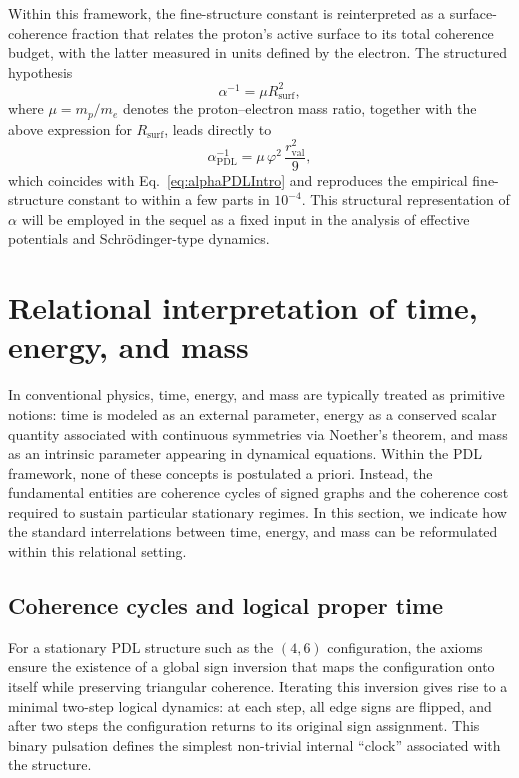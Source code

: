 \documentclass[11pt,a4paper]{article}
\begin{document}
Within this framework, the fine-structure constant is reinterpreted as a surface-coherence fraction that relates the proton’s active surface to its total coherence budget, with the latter measured in units defined by the electron. The structured hypothesis
\begin{equation}
\alpha^{-1} = \mu R_{\mathrm{surf}}^{2},
\end{equation}
where $\mu = m_p/m_e$ denotes the proton--electron mass ratio, together with the above expression for $R_{\mathrm{surf}}$, leads directly to
\begin{equation}
\alpha_{\mathrm{PDL}}^{-1} = \mu\,\varphi^{2}\,\frac{r_{\mathrm{val}}^{2}}{9},
\label{eq:alphaPDL}
\end{equation}
which coincides with Eq.~\eqref{eq:alphaPDLIntro} and reproduces the empirical fine-structure constant to within a few parts in $10^{-4}$.\cite{Laubscher2026DerivationAlpha} This structural representation of $\alpha$ will be employed in the sequel as a fixed input in the analysis of effective potentials and Schr\"odinger-type dynamics.

\section{Relational interpretation of time, energy, and mass}
\label{sec:TimeEnergyMass}

In conventional physics, time, energy, and mass are typically treated as primitive notions: time is modeled as an external parameter, energy as a conserved scalar quantity associated with continuous symmetries via Noether’s theorem, and mass as an intrinsic parameter appearing in dynamical equations. Within the PDL framework, none of these concepts is postulated a priori. Instead, the fundamental entities are coherence cycles of signed graphs and the coherence cost required to sustain particular stationary regimes. In this section, we indicate how the standard interrelations between time, energy, and mass can be reformulated within this relational setting.

\subsection{Coherence cycles and logical proper time}

For a stationary PDL structure such as the $(4,6)$ configuration, the axioms ensure the existence of a global sign inversion that maps the configuration onto itself while preserving triangular coherence.\cite{Laubscher2026IntroPDL,Laubscher2026PDL_English} Iterating this inversion gives rise to a minimal two-step logical dynamics: at each step, all edge signs are flipped, and after two steps the configuration returns to its original sign assignment. This binary pulsation defines the simplest non-trivial internal ``clock'' associated with the structure.\par
\end{document}
